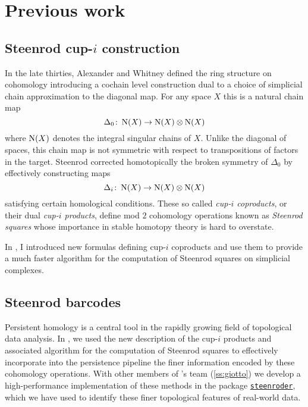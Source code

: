 \section{Previous work} \label{s:past}

\subsection{Steenrod cup-$i$ construction} \label{ss:cup-i}

In the late thirties, Alexander and Whitney defined the ring structure on cohomology introducing a cochain level construction dual to a choice of simplicial chain approximation to the diagonal map.
For any space $X$ this is a natural chain map
\[
\Delta_0 \colon \operatorname{N}(X) \to \operatorname{N}(X) \otimes \operatorname{N}(X)
\]
where $\operatorname{N}(X)$ denotes the integral singular chains of $X$.
Unlike the diagonal of spaces, this chain map is not symmetric with respect to transpositions of factors in the target.
Steenrod \cite{steenrod1947products} corrected homotopically the broken symmetry of $\Delta_0$ by effectively constructing maps
\begin{equation*}
\Delta_i \colon \operatorname{N}(X) \to \operatorname{N}(X) \otimes \operatorname{N}(X)
\end{equation*}
satisfying certain homological conditions.
These so called \textit{cup-$i$ coproducts}, or their dual \textit{cup-$i$ products}, define mod $2$ cohomology operations known as \textit{Steenrod squares} whose importance in stable homotopy theory is hard to overstate.

In \cite{medina2023fast_sq}, I introduced new formulas defining cup-$i$ coproducts and use them to provide a much faster algorithm for the computation of Steenrod squares on simplicial complexes.

\subsection{Steenrod barcodes}

Persistent homology is a central tool in the rapidly growing field of topological data analysis.
In \cite{medina2022per_st}, we used the new description of the cup-$i$ products and associated algorithm for the computation of Steenrod squares to effectively incorporate into the persistence pipeline the finer information encoded by these cohomology operations.
With other members of \giottoTDA's team (\cref{ss:giotto}) we develop a high-performance implementation of these methods in the package \href{https://steenroder.github.io/steenroder/}{\texttt{steenroder}}, which we have used to identify these finer topological features of real-world data.

